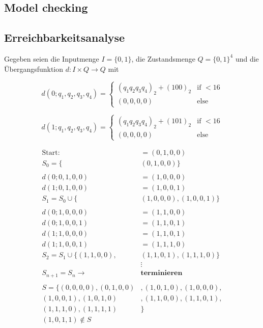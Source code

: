 \documentclass[a4paper,6pt]{article}
\begin{document}
\begin{multicols*}{3}
\section{Model checking}

\subsection*{Erreichbarkeitsanalyse}

Gegeben seien die Inputmenge \( I = \{0, 1\} \), die Zustandsmenge \( Q = \{0, 1\}^4 \) und die Übergangsfunktion \( d : I \times Q \rightarrow Q \) mit


\[
d(0; q_1, q_2, q_3, q_4) = 
\begin{cases}
    (q_1 q_2 q_3 q_4)_2 + (100)_2 & \text{if } < 16 \\
    (0, 0, 0, 0) & \text{else}
\end{cases}
\]

\[
d(1; q_1, q_2, q_3, q_4) = 
\begin{cases}
    (q_1 q_2 q_3 q_4)_2 + (101)_2 & \text{if } < 16 \\
    (0, 0, 0, 0) & \text{else}
\end{cases}
\]

\begin{align*}
    \text{Start:} &= (0,1,0,0) \\
    S_0 = \{&(0,1,0,0)\} \\
    \\
    d(0;0,1,0,0) &= (1,0,0,0) \\
    d(1;0,1,0,0) &= (1,0,0,1) \\
    S_1 = S_0 \cup \{&(1,0,0,0),(1,0,0,1)\} \\
    \\
    d(0;1,0,0,0) &= (1,1,0,0) \\
    d(0;1,0,0,1) &= (1,1,0,1) \\
    d(1;1,0,0,0) &= (1,1,0,1) \\
    d(1;1,0,0,1) &= (1,1,1,0) \\
    S_2 = S_1 \cup \{(1,1,0,0),&(1,1,0,1),(1,1,1,0)\} \\
    &\vdots \\
    S_{n + 1} = S_{n} \rightarrow &\textbf{terminieren} \\
    \\
     S = \{(0,0,0,0),(0,1,0,0)&,(1,0,1,0),(1,0,0,0), \\
    (1,0,0,1),(1,0,1,0)&,(1,1,0,0),(1,1,0,1), \\
    (1,1,1,0),(1,1,1,1)&\} \\
    (1,0,1,1) \notin S&
\end{align*}


\end{multicols*}
\end{document}
